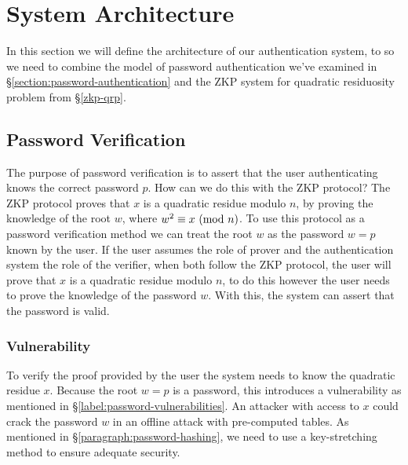 \section{System Architecture}
\label{label:protocol-design}
In this section we will define the architecture of our authentication system, to so we need to combine the model of password authentication we've examined in \S\ref{section:password-authentication} and the ZKP system for quadratic residuosity problem from \S\ref{zkp-qrp}.

\subsection{Password Verification}
\label{section:zkp-password-verification}
The purpose of password verification is to assert that the user authenticating knows the correct password $p$. 
How can we do this with the ZKP protocol?
The ZKP protocol proves that $x$ is a quadratic residue modulo $n$, by proving the knowledge of the root $w$, where  $w^2 \equiv x \ (\mathrm{mod}\ n)$.
To use this protocol as a password verification method we can treat the root $w$ as the password $w = p$ known by the user.
If the user assumes the role of prover and the authentication system the role of the verifier, when both follow the ZKP protocol, the user will prove that $x$ is a quadratic residue modulo $n$, to do this however the user needs to prove the knowledge of the password $w$. 
With this, the system can assert that the password is valid.


\subsubsection{Vulnerability}
To verify the proof provided by the user the system needs to know the quadratic residue $x$.
Because the root $w = p$ is a password, this introduces a vulnerability as mentioned in \S\ref{label:password-vulnerabilities}.
An attacker with access to $x$ could crack the password $w$ in an offline attack with pre-computed tables.
As mentioned in \S\ref{paragraph:password-hashing}, we need to use a key-stretching method to ensure adequate security.






